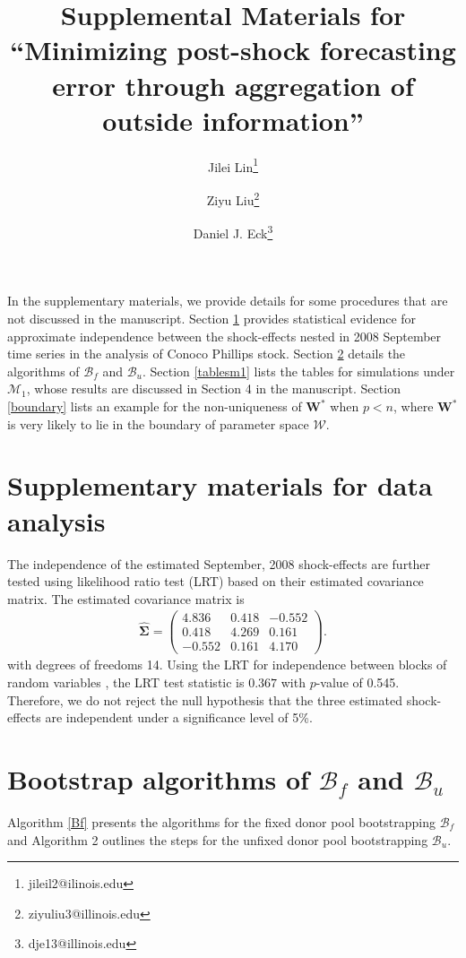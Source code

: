 \documentclass[11pt]{article}
\title{Supplemental Materials for ``Minimizing post-shock forecasting error through aggregation of outside information''}
\author{Jilei Lin\thanks{jileil2@ilinois.edu}}
\author{Ziyu Liu\thanks{ziyuliu3@illinois.edu}}
\author{Daniel J. Eck\thanks{dje13@illinois.edu}}
\affil{Department of Statistics, University of Illinois at Urbana-Champaign}
\def\mbf#1{\mathbf{#1}} %
\def\mc#1{\mathcal{#1}} %
\theoremstyle{definition}
\begin{document}
\maketitle

In the supplementary materials, we provide details for some procedures that are not discussed in the manuscript. Section \ref{smfda} provides statistical evidence for approximate independence between  the shock-effects nested in 2008 September time series in the analysis of Conoco Phillips stock. Section \ref{bf} details the algorithms of $\mc{B}_f$ and $\mc{B}_u$. Section  \ref{tablesm1} lists the tables for simulations under $\mc{M}_1$, whose results are discussed in Section 4 in the manuscript. Section \ref{boundary} lists an example for the non-uniqueness of $\mbf{W}^*$ when $p < n$, where $\mbf{W}^*$ is very likely to lie in the boundary of parameter space $\mc{W}$.


\section{Supplementary materials for data analysis}
\label{smfda}
The independence of the estimated September, 2008 shock-effects are further tested using likelihood ratio test (LRT) based on their estimated covariance matrix. The estimated covariance matrix is
\begin{align*}
  \hat{\mathbf{\Sigma}}=\left(\begin{array}{rrr}
    4.836 & 0.418 & -0.552 \\
    0.418 & 4.269 & 0.161 \\
    -0.552 & 0.161 & 4.170
  \end{array}\right).
\end{align*}
with degrees of freedoms 14. Using the LRT for independence between blocks of random variables \citep[Section 10.2]{msos}, the LRT test statistic is $0.367$ with $p$-value of 0.545. Therefore, we do not reject  the null hypothesis that the three estimated shock-effects are independent under a significance level of 5\%. 

\section{Bootstrap algorithms of  $\mc{B}_f$ and $\mc{B}_u$}
\label{bf}

Algorithm \ref{Bf} presents the algorithms for the fixed donor pool bootstrapping  $\mc{B}_f$ and Algorithm 2 outlines the steps for the unfixed donor pool bootstrapping $\mc{B}_u$.
\end{document}
